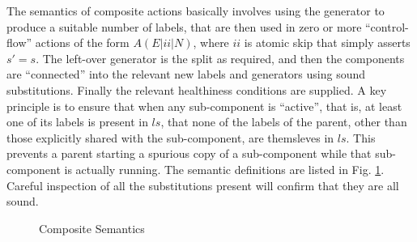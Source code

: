 The semantics of composite actions basically involves using the generator
to produce a suitable number of labels,
that are then used in zero or more ``control-flow'' actions
of the form $A(E|ii|N)$, where $ii$ is atomic skip that simply asserts $s'=s$.
The left-over generator is the split as required,
and then the components are ``connected'' into
the relevant new labels and generators using sound substitutions.
Finally the relevant healthiness conditions are supplied.
A key principle is to ensure that when any sub-component is ``active'',
that is, at least one of its labels is present in $ls$,
that none of the labels of the parent,
other than those explicitly shared with the sub-component,
are themsleves in $ls$.
This prevents a parent starting a spurious copy of a sub-component
while that sub-component is actually running.
The semantic definitions are listed in Fig. \ref{fig:composite-semantics}.
Careful inspection of all the substitutions present will confirm that they
are all sound.
\begin{figure}[t]
  \caption{Composite Semantics}
  \label{fig:composite-semantics}
\end{figure}

